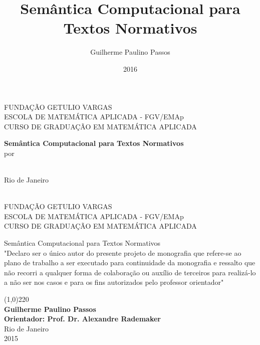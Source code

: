 \documentclass[12pt, a4paper, twoside]{article}
\title{Semântica Computacional para Textos Normativos} \newcommand{\usetitle}{Semântica Computacional para Textos Normativos}
\author{Guilherme Paulino Passos} \newcommand{\useauthor}{\Guilherme Paulino Passos}
\date{2016}
\theoremstyle{definition}
\newcommand{\supervisor}{Alexandre Rademaker}
\begin{document}
\begin{titlepage}
 \begin{center}
  { \large FUNDAÇÃO GETULIO VARGAS}\\[0.3cm]
  { \large ESCOLA DE MATEMÁTICA APLICADA - FGV/EMAp}\\[0.5cm]
  { \large CURSO DE GRADUAÇÃO EM MATEMÁTICA APLICADA}\\[0.3cm]
 
  \vspace{55 mm}

  {\bf \large Semântica Computacional para Textos Normativos}\\[1.2cm]

  { por}\\[0.6cm]
  {\large {\theauthor}}\\[0.1cm]


  \vspace{7cm}

  { Rio de Janeiro}\\[0.1cm]
  {\thedate}\\[0.6cm]
 \end{center}
\end{titlepage}

\begin{titlepage}
 
 \begin{center}
  {\large FUNDAÇÃO GETULIO VARGAS}\\[0.3cm]
  {\large ESCOLA DE MATEMÁTICA APLICADA - FGV/EMAp}\\[0.5cm]
  {\large CURSO DE GRADUAÇÃO EM MATEMÁTICA APLICADA}\\[0.3cm]


  \vspace{20 mm}


  {\large Semântica Computacional para Textos Normativos}\\[2.1cm]

  
  "Declaro ser o único autor do presente projeto de monografia que refere-se ao
plano de trabalho a ser executado para continuidade da monografia e ressalto
que não recorri a qualquer forma de colaboração ou auxílio de terceiros para
realizá-lo a não ser nos casos e para os fins autorizados pelo professor orientador"

  \vspace{3.5cm}
  
  \line(1,0){220}\\[0.1cm]
  {\bf Guilherme Paulino Passos}\\[2cm]
  {\bf Orientador: Prof. Dr. \supervisor}\\[3cm]


  {Rio de Janeiro}\\[0.1cm]
  {2015}
 \end{center}
\end{titlepage}
\end{document}
